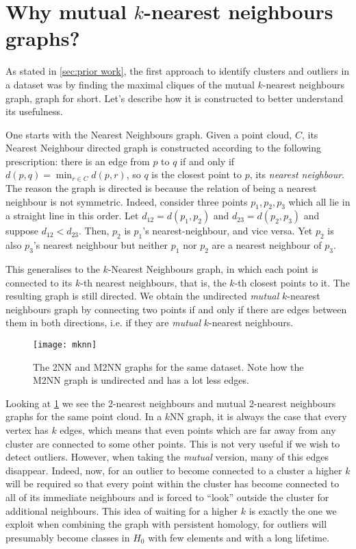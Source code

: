 \documentclass[../main.tex]{subfiles}
\begin{document}
\section{Why mutual \texorpdfstring{\( k \)}{k}-nearest neighbours graphs?}
As stated in \cref{sec:prior work}, the first approach to identify clusters and outliers
in a dataset was by finding the maximal cliques of the mutual \( k \)-nearest neighbours
graph, \MKNN graph for short. Let's describe how it is constructed to better understand
its usefulness. 

One starts with the Nearest Neighbours graph. Given a point cloud, \( C
\), its Nearest Neighbour directed graph is constructed according to the following
prescription: there is an edge from \( p \) to \( q \) if and only if \( d(p,q) = \min_{r
	\in C} d(p,r) \), so \( q \) is the closest point to \( p \), its \emph{nearest
neighbour}. The reason the graph is directed is because the relation of being a nearest
neighbour is not symmetric. Indeed, consider three points \( p_1, p_2, p_3 \) which all
lie in a straight line in this order. Let \( d_{12} = d(p_1, p_2) \)  and \( d_{23} =
d(p_2,p_3) \) and suppose \( d_{12} < d_{23} \). Then, \( p_2 \) is \( p_1 \)'s
nearest-neighbour, and vice versa. Yet \( p_2 \) is also \( p_3 \)'s nearest neighbour but
neither \( p_1 \) nor \( p_2 \) are a nearest neighbour of \( p_3 \).

This generalises to the \( k \)-Nearest Neighbours graph, in which each point is connected
to its \( k \)-th nearest neighbours, that is, the \( k \)-th closest points to it. The
resulting graph is still directed. We obtain the undirected \emph{mutual} \( k \)-nearest
neighbours graph by connecting two points if and only if there are edges between them
in both directions, i.e. if they are \emph{mutual} \( k \)-nearest neighbours. 

\begin{figure}[htb]
	\centering
	\texttt{[image: mknn]}
	\caption{The 2NN and M2NN graphs for the same dataset. Note how the M2NN graph is
	undirected and has a lot less edges.}
	\label{fig:mknn}
\end{figure}

Looking at \cref{fig:mknn} we see the 2-nearest neighbours and mutual 2-nearest neighbours
graphs for the same point cloud. In a \( k \)NN	 graph, it is always the case that every
vertex has \( k \) edges, which means that even points which are far away from any cluster
are connected to some other points. This is not very useful if we wish to detect outliers.
However, when taking the \emph{mutual} version, many of this edges disappear. Indeed, now,
for an outlier to become connected to a cluster a higher \( k \) will be required so that
every point within the cluster has become connected to all of its immediate neighbours and
is forced to ``look'' outside the cluster for additional neighbours. This idea of waiting
for a higher \( k \) is exactly the one we exploit when combining the \MKNN graph with
persistent homology, for outliers will presumably become classes in	\( H_0 \) with few
elements and with a long lifetime. 
\end{document}
